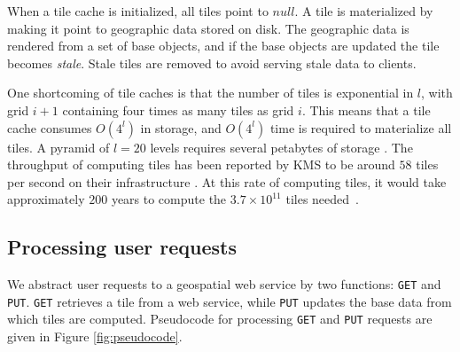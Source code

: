 \documentclass[11pt, oneside]{report}
\begin{document}
When a tile cache is initialized, all tiles point to $null$. A tile is materialized by making it point to geographic data stored on disk. The geographic data is rendered from a set of base objects, and if the base objects are updated the tile becomes \emph{stale}. Stale tiles are removed to avoid serving stale data to clients.

One shortcoming of tile caches is that the number of tiles is exponential in $l$, with grid $i+1$ containing four times as many tiles as grid $i$. This means that a tile cache consumes $O(4^l)$ in storage, and $O(4^l)$ time is required to materialize all tiles. A pyramid of $l=20$ levels requires several petabytes of storage \cite{garcia11}. The throughput of computing tiles has been reported by KMS to be around $58$ tiles per second on their infrastructure \cite{lindegaard12}. At this rate of computing tiles, it would take approximately $200$ years to compute the $3.7 \times 10^{11}$ tiles needed~\cite{garcia11}.

\subsection{Processing user requests}
\label{sec:processing:user:requests}
We abstract user requests to a geospatial web service by two functions: \texttt{GET} and \texttt{PUT}. \texttt{GET} retrieves a tile from a web service, while \texttt{PUT} updates the base data from which tiles are computed. Pseudocode for processing \texttt{GET} and \texttt{PUT} requests are given in Figure \ref{fig:pseudocode}.
\end{document}
